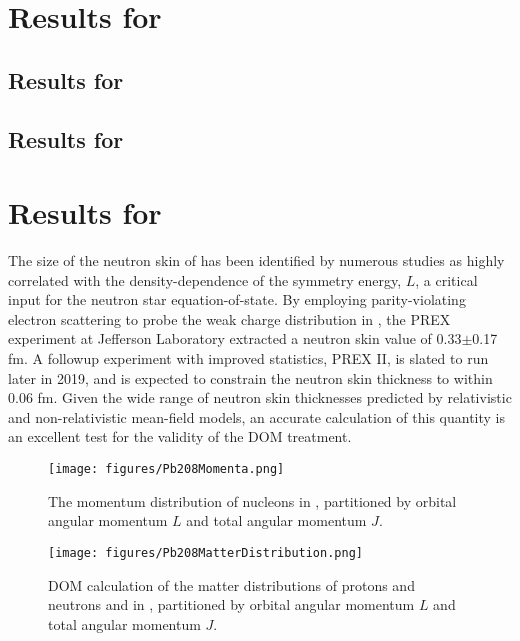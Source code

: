 \section{Results for \snTwelveFour}
\subsection{Results for \snTwelve}
\subsection{Results for \snFour}

\section{Results for \pbEight}
The size of the neutron skin of \pbEight has been identified by numerous studies as highly
correlated with the density-dependence of the symmetry energy, $L$, a critical input for the neutron
star equation-of-state. By employing parity-violating electron scattering to probe the
weak charge distribution in \pbEight, the PREX experiment at Jefferson Laboratory extracted a
\pbEight neutron skin value of 0.33$\pm$0.17 fm. A followup experiment with improved statistics, PREX II,
is slated to run later in 2019, and is expected to constrain the \pbEight neutron skin thickness to
within 0.06 fm. Given the wide range of \pbEight neutron skin thicknesses predicted by relativistic
and non-relativistic mean-field models, an accurate calculation of this quantity is an excellent
test for the validity of the DOM treatment.

\begin{figure}[tb]
    \centering
    \texttt{[image: figures/Pb208Momenta.png]}
    \caption[The single-particle momentum distributions in \pbEight]
    {
        The momentum distribution of nucleons in \pbEight, partitioned
        by orbital angular momentum $L$ and total angular momentum $J$.
    }
    \label{Pb208Momenta}
\end{figure}

\begin{figure}[tb]
    \centering
    \texttt{[image: figures/Pb208MatterDistribution.png]}
    \caption[The proton and neutron point distributions in \pbEight]
    {
        DOM calculation of the matter distributions of protons and neutrons and in \pbEight,
        partitioned by orbital angular momentum $L$ and total angular momentum $J$.
    }
    \label{Pb208MatterDistribution}
\end{figure}

